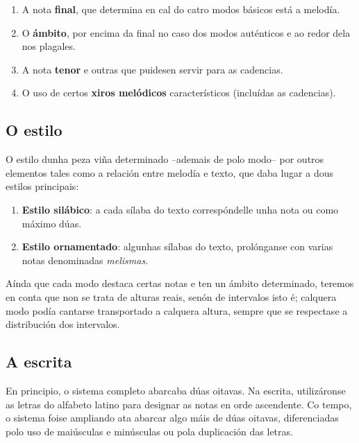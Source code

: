 \documentclass[a4paper, twoside]{templates/ociamthesis}
\providecommand{\tightlist}{%
  \setlength{\itemsep}{0pt}\setlength{\parskip}{0pt}}
\begin{document}
\begin{enumerate}
\def\labelenumi{\arabic{enumi}.}
\tightlist
\item
  A nota \textbf{final}, que determina en cal do catro modos básicos está a melodía.
\item
  O \textbf{ámbito}, por encima da final no caso dos modos auténticos e ao redor dela nos plagales.
\item
  A nota \textbf{tenor} e outras que puidesen servir para as cadencias.
\item
  O uso de certos \textbf{xiros melódicos} característicos (incluídas as cadencias).
\end{enumerate}

\hypertarget{o-estilo}{%
\subsection{O estilo}\label{o-estilo}}

O estilo dunha peza viña determinado --ademais de polo modo-- por outros elementos tales como a relación entre melodía e texto, que daba lugar a dous estilos principais:

\begin{enumerate}
\def\labelenumi{\arabic{enumi}.}
\tightlist
\item
  \textbf{Estilo silábico}: a cada sílaba do texto correspóndelle unha nota ou como máximo dúas.
\item
  \textbf{Estilo ornamentado}: algunhas sílabas do texto, prolónganse con varias notas denominadas \emph{melismas}.
\end{enumerate}

Aínda que cada modo destaca certas notas e ten un ámbito determinado, teremos en conta que non se trata de alturas reais, senón de intervalos isto é; calquera modo podía cantarse transportado a calquera altura, sempre que se respectase a distribución dos intervalos.

\hypertarget{a-escrita}{%
\subsection{A escrita}\label{a-escrita}}

En principio, o sistema completo abarcaba dúas oitavas. Na escrita, utilizáronse as letras do alfabeto latino para designar as notas en orde ascendente. Co tempo, o sistema foise ampliando ata abarcar algo máis de dúas oitavas, diferenciadas polo uso de maiúsculas e minúsculas ou pola duplicación das letras.
\end{document}
